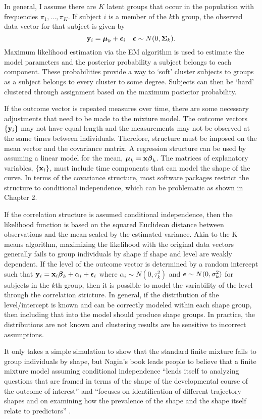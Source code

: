 In general, I assume there are $K$ latent groups that occur in the population with frequencies $\pi_{1},...,\pi_{K}$. If subject $i$ is a member of the $k$th group, the observed data vector for that subject is given by
$$\mathbf y_{i} = \boldsymbol\mu_{k}+\boldsymbol\epsilon_{i}\quad \boldsymbol\epsilon \sim N(0,\boldsymbol\Sigma_{k}).$$
Maximum likelihood estimation via the EM algorithm is used to estimate the model parameters and the posterior probability a subject belongs to each component. These probabilities provide a way to `soft' cluster subjects to groups as a subject belongs to every cluster to some degree. Subjects can then be `hard' clustered through assignment based on the maximum posterior probability. 

If the outcome vector is repeated measures over time, there are some necessary adjustments that need to be made to the mixture model. The outcome vectors $\{\mathbf y_{i}\}$ may not have equal length and the measurements may not be observed at the same times between individuals. Therefore, structure must be imposed on the mean vector and the covariance matrix. A regression structure can be used by assuming a linear model for the mean, $\boldsymbol\mu_k=\mathbf x \boldsymbol\beta_k$. The matrices of explanatory variables, $\{\mathbf x_{i}\}$, must include time components that can model the shape of the curve.  In terms of the covariance structure, most software packages restrict the structure to conditional independence, which can be problematic as shown in Chapter 2.

If the correlation structure is assumed conditional independence, then the likelihood function is based on the squared Euclidean distance between observations and the mean scaled by the estimated variance. Akin to the K-means algorithm, maximizing the likelihood with the original data vectors generally fails to group individuals by shape if shape and level are weakly dependent. If the level of the outcome vector is determined by a random intercept such that $\mathbf y_{i} = \mathbf x_{i}\boldsymbol\beta_{k} + \alpha_{i}+\boldsymbol\epsilon_{i}$ where $\alpha_{i}\sim N(0,\tau_k^{2})$ and $\boldsymbol\epsilon\sim N(0,\sigma^{2}_{k})$ for subjects in the $k$th group, then it is possible to model the variability of the level through the correlation stricture. In general, if the distribution of the level/intercept is known and can be correctly modeled within each shape group, then including that into the model should produce shape groups. In practice, the distributions are not known and clustering results are be sensitive to incorrect assumptions.

It only takes a simple simulation to show that the standard finite mixture fails to group individuals by shape, but Nagin's book leads people to believe that a finite mixture model assuming conditional independence ``lends itself to analyzing questions that are framed in terms of the shape of the developmental course of the outcome of interest''  and  ``focuses on identification of different trajectory shapes and on examining how the prevalence of the shape and the shape itself relate to predictors'' \cite{nagin2005}. 


